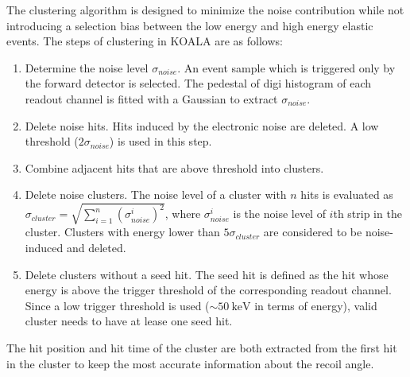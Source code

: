 \documentclass[number,5p]{elsarticle}
\begin{document}
The clustering algorithm is designed to minimize the noise contribution while
not introducing a selection bias between the low energy and high energy elastic events.
The steps of clustering in KOALA are as follows:
\begin{enumerate}
\item Determine the noise level $\sigma_{noise}$. An event sample which is
  triggered only by the forward detector is selected. The pedestal of digi
  histogram of each readout channel is fitted with a Gaussian to extract $\sigma_{noise}$.
\item Delete noise hits. Hits induced by the electronic noise are deleted. A low
  threshold ($2\sigma_{noise}$) is used in this step.
\item Combine adjacent hits that are above threshold into clusters.
\item Delete noise clusters. The noise level of a cluster with $n$ hits is evaluated as
  $\sigma_{cluster} = \sqrt{\sum_{i=1}^n{(\sigma_{noise}^i)^2}}$, where $\sigma_{noise}^i$ is
  the noise level of $i$th strip in the cluster. Clusters with energy lower than $5\sigma_{cluster}$ are considered to be noise-induced and deleted.
\item Delete clusters without a seed hit. The seed hit is defined as the
  hit whose energy is above the trigger threshold of the corresponding readout
  channel. Since a low trigger threshold is used ($\sim\SI{50}{\keV}$ in terms
  of energy), valid cluster needs to have at lease one seed hit.
\end{enumerate}
The hit position and hit time of the cluster are both extracted from the first
hit in the cluster to keep the most accurate information about the recoil angle.
\end{document}
